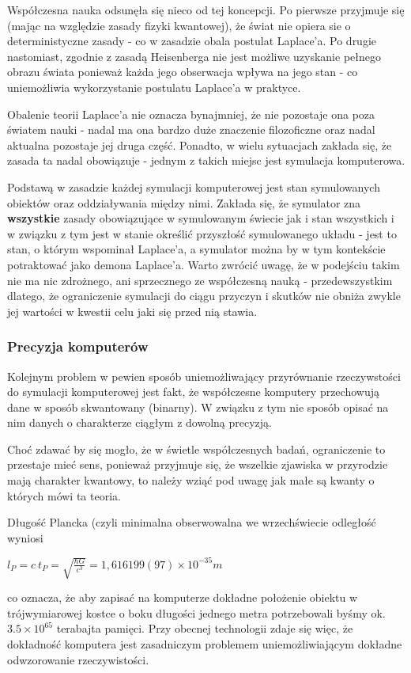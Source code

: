 \par{
Współczesna nauka odsunęła się nieco od tej koncepcji. Po pierwsze przyjmuje się (mając na względzie zasady fizyki kwantowej), że świat nie opiera sie o deterministyczne zasady - co w zasadzie obala postulat Laplace'a. Po drugie nastomiast, zgodnie z zasadą Heisenberga nie jest możliwe uzyskanie pełnego obrazu świata ponieważ każda jego obserwacja wpływa na jego stan - co uniemożliwia wykorzystanie postulatu Laplace'a w praktyce.
}
\par{
Obalenie teorii Laplace'a nie oznacza bynajmniej, że nie pozostaje ona poza światem nauki - nadal ma ona bardzo duże znaczenie filozoficzne oraz nadal aktualna pozostaje jej druga część. Ponadto, w wielu sytuacjach zakłada się, że zasada ta nadal obowiązuje - jednym z takich miejsc jest symulacja komputerowa.
}
\par{
Podstawą w zasadzie każdej symulacji komputerowej jest stan symulowanych obiektów oraz oddziaływania między nimi. Zakłada się, że symulator zna \textbf{wszystkie} zasady obowiązujące w symulowanym świecie jak i stan wszystkich i w związku z tym jest w stanie określić przyszłość symulowanego układu - jest to stan, o którym wspominał Laplace'a, a symulator można by w tym kontekście potraktować jako demona Laplace'a. Warto zwrócić uwagę, że w podejściu takim nie ma nic zdrożnego, ani sprzecznego ze współczesną nauką - przedewszystkim dlatego, że ograniczenie symulacji do ciągu przyczyn i skutków nie obniża zwykle jej wartości w kwestii celu jaki się przed nią stawia.
}

\subsubsection{Precyzja komputerów}
\par{
Kolejnym problem w pewien sposób uniemożliwający przyrównanie rzeczywstości do symulacji komputerowej jest fakt, że współczesne komputery przechowują dane w sposób skwantowany (binarny). W związku z tym nie sposób opisać na nim danych o charakterze ciągłym z dowolną precyzją.
}
\par{
Choć zdawać by się mogło, że w świetle współczesnych badań, ograniczenie to przestaje mieć sens, ponieważ przyjmuje się, że wszelkie zjawiska w przyrodzie mają charakter kwantowy, to należy wziąć pod uwagę jak małe są kwanty o których mówi ta teoria.
}
\par{
Długość Plancka (czyli minimalna obserwowalna we wrzechświecie odległość wyniosi 
\begin{center}
$l_P = c \ t_P = \sqrt{\frac{\hbar G}{c^3}} = 1,616 199(97) \times 10^{-35} m$
\end{center}
co oznacza, że aby zapisać na komputerze dokładne położenie obiektu w trójwymiarowej kostce o boku długości jednego metra potrzebowali byśmy ok. $3.5 \times 10^{65}$ terabajta pamięci. Przy obecnej technologii zdaje się więc, że dokładność komputera jest zasadniczym problemem uniemożliwiającym dokładne odwzorowanie rzeczywistości.
}

